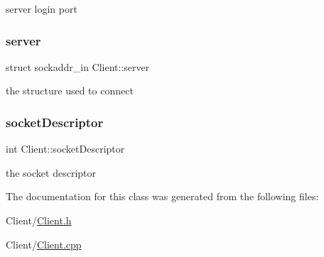 server login port \mbox{\label{classClient_a5a642940108c175ea6ce84fa121a0a09}} 
\subsubsection{\texorpdfstring{server}{server}}
{\footnotesize\ttfamily struct sockaddr\+\_\+in Client\+::server\hspace{0.3cm}{\ttfamily [private]}}

the structure used to connect \mbox{\label{classClient_a9f98046d3d62a69810a59430cd88992e}} 
\subsubsection{\texorpdfstring{socket\+Descriptor}{socketDescriptor}}
{\footnotesize\ttfamily int Client\+::socket\+Descriptor\hspace{0.3cm}{\ttfamily [private]}}

the socket descriptor 

The documentation for this class was generated from the following files\+:\begin{DoxyCompactItemize}
\item 
Client/\mbox{\hyperlink{Client_8h}{Client.\+h}}\item 
Client/\mbox{\hyperlink{Client_8cpp}{Client.\+cpp}}\end{DoxyCompactItemize}

